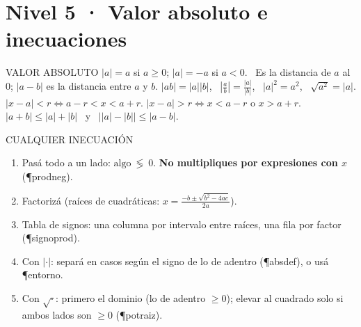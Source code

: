 \section*{Nivel 5 · Valor absoluto e inecuaciones}
\begin{sello}{VALOR ABSOLUTO}
 $|a|=a$ si $a\ge0$; $|a|=-a$ si $a<0$. \ Es la distancia de $a$ al 0; $|a-b|$ es la distancia entre $a$ y $b$.
 $|ab|=|a||b|$, \ $\left|\frac ab\right|=\frac{|a|}{|b|}$, \ $|a|^2=a^2$, \ $\sqrt{a^2}=|a|$.
 $|x-a|<r\iff a-r<x<a+r$. \quad $|x-a|>r\iff x<a-r$ o $x>a+r$.
 $|a+b|\le|a|+|b|$ \ y \ $\big||a|-|b|\big|\le|a-b|$.
\end{sello}
\begin{metodo}{CUALQUIER INECUACIÓN}
\begin{enumerate}
\item Pasá todo a un lado: $\text{algo}\ \lessgtr\ 0$. \textbf{No multipliques por expresiones con $x$} (\P{prodneg}).
\item Factorizá (raíces de cuadráticas: $x=\frac{-b\pm\sqrt{b^2-4ac}}{2a}$).
\item Tabla de signos: una columna por intervalo entre raíces, una fila por factor (\P{signoprod}).
\item Con $|\cdot|$: separá en casos según el signo de lo de adentro (\P{absdef}), o usá \P{entorno}.
\item Con $\sqrt{\cdot}$: primero el dominio (lo de adentro $\ge0$); elevar al cuadrado solo si ambos lados son $\ge0$ (\P{potraiz}).
\end{enumerate}
\end{metodo}

